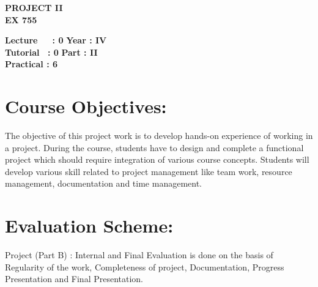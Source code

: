 \begin{center}
    \textbf{\huge{\uppercase{Project II}}}
    \\
    \vspace{.5cm}
    \textbf{\large{EX 755}}
\end{center}

\noindent\textbf{Lecture\ \ \ : 0} \hfill \textbf{Year : IV} \\
\textbf{Tutorial \ : 0} \hfill \textbf{Part : II } \\
\textbf{Practical : 6}  \\

\par
\noindent 
\section*{Course Objectives:}
The objective of this project work is to develop hands-on experience of working in a project. During the course, students have to design and complete a functional project which should require integration of various course concepts. Students will develop various skill related to project management like team work, resource management, documentation and time management.



\section*{Evaluation Scheme:}
Project (Part B) : Internal and Final Evaluation is done on the basis of Regularity of the work, Completeness of project, Documentation, Progress Presentation and Final Presentation.